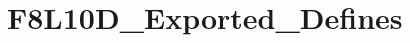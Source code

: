\hypertarget{group___f8_l10_d___exported___defines}{}\section{F8\+L10\+D\+\_\+\+Exported\+\_\+\+Defines}
\label{group___f8_l10_d___exported___defines}

